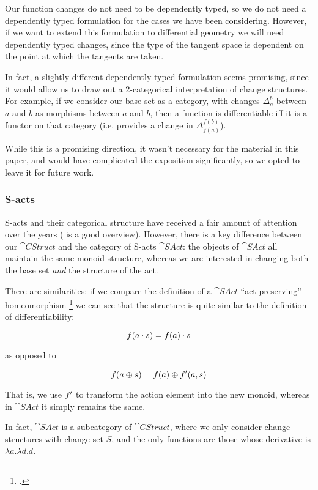 Our function changes do not need to be dependently typed, so we do not need a
dependently typed formulation for the cases we have been considering. However,
if we want to extend this formulation to differential geometry we will need
dependently typed changes, since the type of the tangent space is
dependent on the point at which the tangents are taken.

In fact, a slightly different dependently-typed formulation seems promising, since it would allow us
to draw out a 2-categorical interpretation of change structures. For example, if
we consider our base set as a category, with changes $\Delta_a^b$ between $a$
and $b$ as morphisms between $a$ and $b$, then a function is
differentiable iff it is a functor on that category (i.e. provides a change in
$\Delta_{f(a)}^{f(b)}$). 

While this is a promising direction, it wasn't necessary for the material in
this paper, and would have complicated the exposition significantly, so we opted
to leave it for future work.

\subsubsection{S-acts}

S-acts and their categorical structure have received a fair amount of attention
over the years (\textcite{kilp2000monoids} is a good
overview). However, there is a key difference between our $\cat{CStruct}$ and the category of
S-acts $\cat{SAct}$: the objects of $\cat{SAct}$ all maintain the same monoid
structure, whereas we are interested in changing both the base set \emph{and} the structure of the act.

There are similarities: if we compare the definition of a $\cat{SAct}$ ``act-preserving''
homeomorphism \footcite[See][]{kilp2000monoids} we can see that the structure is
quite similar to the definition of differentiability:

$$f(a \cdot s) = f(a) \cdot s$$

as opposed to

$$f(a \oplus s) = f(a) \oplus f'(a, s)$$

That is, we use $f'$ to transform the action element into the new
monoid, whereas in $\cat{SAct}$ it simply remains the same.

In fact, $\cat{SAct}$ is a subcategory of $\cat{CStruct}$, where we only
consider change structures with change set $S$, and the only functions are those
whose derivative is $\lambda a. \lambda d. d$.

